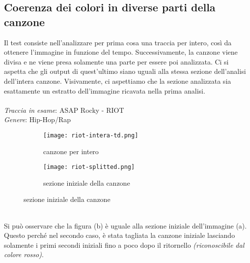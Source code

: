 \documentclass{article}
\begin{document}
\subsection{Coerenza dei colori in diverse parti della canzone}
Il test consiste nell'analizzare per prima cosa una traccia per intero, così da
ottenere l'immagine in funzione del tempo. Successivamente, la canzone viene
divisa e ne viene presa solamente una parte per essere poi analizzata. Ci si
aspetta che gli output di quest'ultimo siano uguali alla stessa sezione
dell'analisi dell'intera canzone. Visivamente, ci aspettiamo che la sezione
analizzata sia esattamente un estratto dell'immagine ricavata nella prima
analisi. \\ \\ \textit{Traccia in esame}: ASAP Rocky - RIOT\\ \textit{Genere}:
Hip-Hop/Rap\\
\begin{figure}[h]
    \centering
    \begin{subfigure}{0.5\linewidth}
        \centering
        \texttt{[image: riot-intera-td.png]}
        \caption{canzone per intero}
        \label{fig:sub1}
    \end{subfigure}%
    \begin{subfigure}{0.5\linewidth}
        \centering
        \texttt{[image: riot-splitted.png]}
        \caption{sezione iniziale della canzone}
        \label{fig:sub2}
    \end{subfigure}
    \label{fig:analisi-canzone-separata}
\end{figure}
\\
Si può osservare che la figura (b) è uguale alla sezione iniziale dell'immagine (a). Questo perché nel secondo caso, è stata tagliata la canzone iniziale lasciando solamente i primi secondi iniziali fino a poco dopo il ritornello \textit{(riconoscibile dal colore rosso)}.
\newpage
\end{document}
